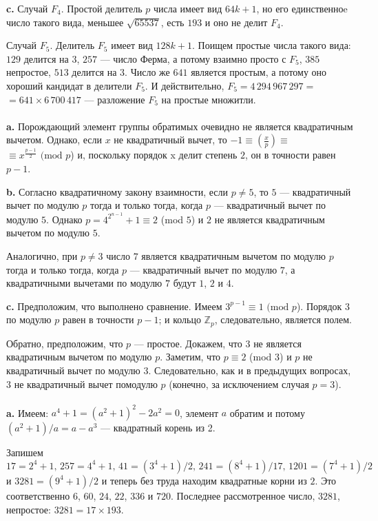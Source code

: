 \documentclass{mai_book}
\begin{document}
\textbf{c. } Случай $F_{4}$. Простой делитель $p$ числа имеет вид $64k+1$, но его единственноe число такого вида, меньшее $\sqrt{65537}$, есть $193$ и оно не делит $F_{4}$. \par
Случай $F_{5}$. Делитель $F_{5}$ имеет вид $128k+1$. Поищем простые числа такого вида: $129$ делится на $3$, $257$ --- число Ферма, а потому взаимно просто с $F_{5}$, $385$ непростое, $513$ делится на $3$. Число же $641$ является простым, а потому оно хороший кандидат в делители $F_{5}$. И действительно, $F_{5} = 4 \,294 \, 967 \, 297 =$ $=641 \times 6 \, 700 \, 417$ --- разложение $F_{5}$ на простые множитли. \\

 \\

\textbf{a. } Порождающий элемент группы обратимых очевидно не является квадратичным вычетом. Однако, если $x$ не квадратичный вычет, то $-1 \equiv (\frac{x}{p}) \equiv$ $\equiv x^{\frac{p-1}{2}} \text{ (mod } p$) и, поскольку порядок x делит степень $2$, он в точности равен $p-1$. \smallskip

\textbf{b. } Согласно квадратичному закону взаимности, если $p \neq 5$, то $5$ --- квадратичный вычет по модулю $p$ тогда и только тогда, когда $p$ --- квадратичный вычет по модулю $5$. Однако $p = 4^{2^{n-1}} + 1 \equiv 2${} (mod $5$) и $2$ не является квадратичным вычетом по модулю $5$. \par
Аналогично, при $p \neq 3$ число $7$ является квадратичным вычетом по модулю $p$ тогда и только тогда, когда $p$ --- квадратичный вычет по модулю $7$, а квадратичными вычетами по модулю $7$ будут $1$, $2$ и $4$. \smallskip

\textbf{c. } Предположим, что выполнено сравнение. Имеем $3^{p-1} \equiv 1 \text{ (mod } p$). Порядок $3$ по модулю $p$ равен в точности $p - 1$; и кольцо $\mathbb{Z}_{p}$, следовательно, является полем. \par
Обратно, предположим, что $p$ --- простое. Докажем, что $3$ не является квадратичным вычетом по модулю $p$. Заметим, что $p \equiv 2${} (mod $3$) и $p$ не квадратичный вычет по модулю $3$. Следовательно, как и в предыдущих вопросах, $3$ не квадратичный вычет помодулю $p$ (конечно, за исключением случая $p = 3$). \\

 \\

\textbf{a. } Имеем: $a^{4} + 1 = (a^{2} + 1)^{2} - 2a^{2} = 0$, элемент $a$ обратим и потому $(a^{2}+1)/a = a - a^{3}$ --- квадратный корень из 2. \par
Запишем $17 = 2^4 + 1, \, 257 = 4^4 + 1, \, 41 = (3^{4} + 1)/2, \, 241 = (8^{4} + 1)/17, \, 1201 = (7^{4} + 1)/2$ и $3281 = (9^{4} + 1)/2$ и теперь без труда находим квадратные корни из $2$. Это соответственно $6$, $60$, $24$, $22$, $336$ и $720$. Последнее рассмотренное число, $3281$, непростое: $3281 = 17 \times 193$. \smallskip
\end{document}
